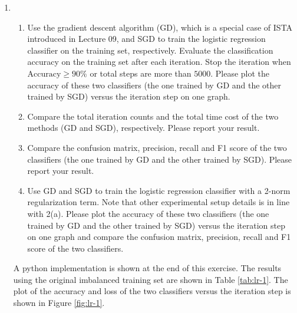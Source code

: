 \begin{exercise}
\begin{enumerate}
        \item
            \begin{enumerate}
                \item Use the gradient descent algorithm (GD), which is a special case of ISTA introduced in Lecture 09, and SGD to train the logistic regression classifier on the training set, respectively. Evaluate the classification accuracy on the training set after each iteration. Stop the iteration when $\text{Accuracy}\geq 90\%$ or total steps are more than $5000$. Please plot the accuracy of these two classifiers (the one trained by GD and the other trained by SGD) versus the iteration step on one graph.
                \item Compare the total iteration counts and the total time cost of the two methods (GD and SGD), respectively. Please report your result.
                \item Compare the confusion matrix, precision, recall and F1 score of the two classifiers (the one trained by GD and the other trained by SGD). Please report your result.
                \item Use GD and SGD to train the logistic regression classifier with a 2-norm regularization term. Note that other experimental setup details is in line with 2(a). Please plot the accuracy of these two classifiers (the one trained by GD and the other trained by SGD) versus the iteration step on one graph and compare the confusion matrix, precision, recall and F1 score of the two classifiers.
            \end{enumerate}

            \begin{solution}
                A python implementation is shown at the end of this exercise. The results using the original imbalanced training set are shown in Table \ref{tab:lr-1}. The plot of the accuracy and loss of the two classifiers versus the iteration step is shown in Figure \ref{fig:lr-1}.


\end{solution}
\end{enumerate}
\end{exercise}
